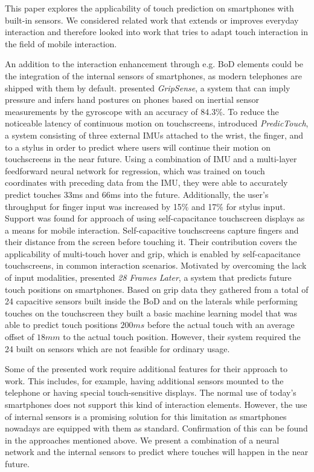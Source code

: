 This paper explores the applicability of touch prediction on smartphones with built-in sensors. 
We considered related work that extends or improves everyday interaction and therefore looked into work that tries to adapt touch interaction in the field of mobile interaction.

An addition to the interaction enhancement through e.g. BoD elements could be the integration of the internal sensors of smartphones, as modern telephones are shipped with them by default.
\citeauthor{Goel2012a} \cite{Goel2012a} presented \textit{GripSense}, a system that can imply pressure and infers hand postures on phones based on inertial sensor measurements by the gyroscope with an accuracy of 84.3\%.
To reduce the noticeable latency of continuous motion on touchscreens, \citeauthor{Le2017:Predic} \cite{Le2017:Predic} introduced \textit{PredicTouch}, a system consisting of three external IMUs attached to the wrist, the finger, and to a stylus in order to predict where users will continue their motion on touchscreens in the near future.
Using a combination of IMU and a multi-layer feedforward neural network for regression, which was trained on touch coordinates with preceding data from the IMU, they were able to accurately predict touches 33ms and 66ms into the future.
Additionally, the user's throughput for finger input was increased by 15\% and 17\% for stylus input.
Support was found for \citeauthor{Hinckley2016} \cite{Hinckley2016} approach of using self-capacitance touchscreen displays as a means for mobile interaction.
Self-capacitive touchscreens capture fingers and their distance from the screen before touching it.  
Their contribution covers the applicability of multi-touch hover and grip, which is enabled by self-capacitance touchscreens, in common interaction scenarios.
Motivated by overcoming the lack of input modalities, \citeauthor{MohdNoor2016} \cite{MohdNoor2016} presented \textit{28 Frames Later}, a system that predicts future touch positions on smartphones.
Based on grip data they gathered from a total of 24 capacitive sensors built inside the BoD and on the laterals while performing touches on the touchscreen they built a basic machine learning model that was able to predict touch positions $ 200ms $ before the actual touch with an average offset of $ 18mm $ to the actual touch position.
However, their system required the 24 built on sensors which are not feasible for ordinary usage.

Some of the presented work require additional features for their approach to work.
This includes, for example, having additional sensors mounted to the telephone or having special touch-sensitive displays. 
The normal use of today's smartphones does not support this kind of interaction elements.
However, the use of internal sensors is a promising solution for this limitation as smartphones nowadays are equipped with them as standard.
Confirmation of this can be found in the approaches mentioned above.
We present a combination of a neural network and the internal sensors to predict where touches will happen in the near future. 
